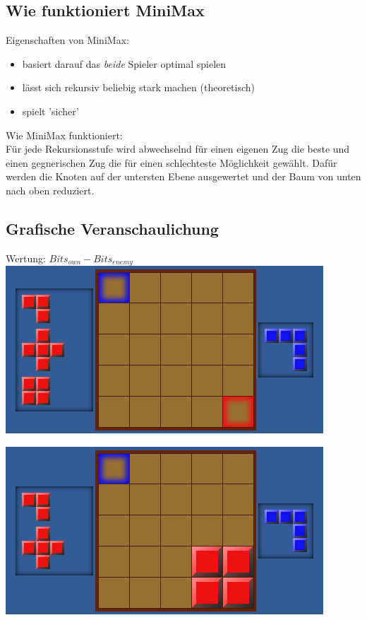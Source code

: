 \documentclass[12pt]{beamer}
\begin{document}
\subsection{Wie funktioniert MiniMax}
\begin{frame}
	Eigenschaften von MiniMax:
	\begin{itemize}
		\item basiert darauf das \emph{beide} Spieler optimal spielen
		\item lässt sich rekursiv beliebig stark machen (theoretisch)
		\item spielt 'sicher'
	\end{itemize}
	Wie MiniMax funktioniert:\\
	Für jede Rekursionsstufe wird abwechselnd für einen eigenen Zug die beste und einen gegnerischen Zug die für einen schlechteste Möglichkeit gewählt. Dafür werden die Knoten auf der untersten Ebene ausgewertet und der Baum von unten nach oben reduziert.\\
\end{frame}

\subsection{Grafische Veranschaulichung}
\begin{frame}
	Wertung: $Bits_{own}-Bits_{enemy}$\\
	\pause
	\includegraphics[width=\linewidth]{media/mm1.png}
\end{frame}

\begin{frame}
	\includegraphics[width=\linewidth]{media/mm3.png}
\end{frame}
\end{document}
